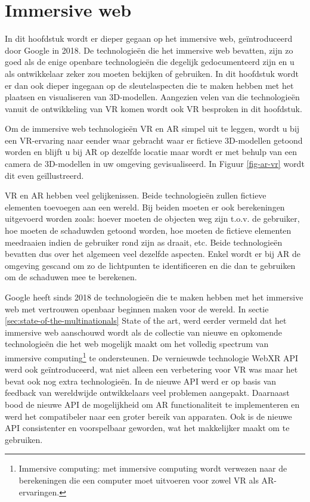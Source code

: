\chapter{Immersive web}
\label{ch:immersive-web}

In dit hoofdstuk wordt er dieper gegaan op het immersive web, geïntroduceerd door Google in 2018. De technologieën die het immersive web bevatten, zijn zo goed als de enige openbare technologieën die degelijk gedocumenteerd zijn en u als ontwikkelaar zeker zou moeten bekijken of gebruiken. In dit hoofdstuk wordt er dan ook dieper ingegaan op de sleutelaspecten die te maken hebben met het plaatsen en visualiseren van 3D-modellen.
Aangezien velen van die technologieën vanuit de ontwikkeling van VR komen wordt ook VR besproken in dit hoofdstuk.

Om de immersive web technologieën VR en AR simpel uit te leggen, wordt u bij een VR-ervaring naar eender waar gebracht waar er fictieve 3D-modellen getoond worden en blijft u bij AR op dezelfde locatie maar wordt er met behulp van een camera de 3D-modellen in uw omgeving gevisualiseerd. In Figuur \ref{fig-ar-vr} wordt dit even geïllustreerd. 

VR en AR hebben veel gelijkenissen. Beide technologieën zullen fictieve elementen toevoegen aan een wereld. Bij beiden moeten er ook berekeningen uitgevoerd worden zoals: hoever moeten de objecten weg zijn t.o.v. de gebruiker, hoe moeten de schaduwden getoond worden, hoe moeten de fictieve elementen meedraaien indien de gebruiker rond zijn as draait, etc. Beide technologieën bevatten dus over het algemeen veel dezelfde aspecten. Enkel wordt er bij AR de omgeving gescand om zo de lichtpunten te identificeren en die dan te gebruiken om de schaduwen mee te berekenen.

Google heeft sinds 2018 de technologieën die te maken hebben met het immersive web met vertrouwen openbaar beginnen maken voor de wereld. 
In sectie \ref{sec:state-of-the-multinationals} State of the art, werd eerder vermeld dat het immersive web aanschouwd wordt als de collectie van nieuwe en opkomende technologieën die het web mogelijk maakt om het volledig spectrum van immersive computing\footnote{Immersive computing: met immersive computing wordt verwezen naar de berekeningen die een computer moet uitvoeren voor zowel VR als AR-ervaringen.} te ondersteunen. De vernieuwde technologie WebXR API werd ook geïntroduceerd, wat niet alleen een verbetering voor VR was maar het bevat ook nog extra technologieën. In de nieuwe API werd er op basis van feedback van wereldwijde ontwikkelaars veel problemen aangepakt. Daarnaast bood de nieuwe API de mogelijkheid om AR functionaliteit te implementeren en werd het compatibeler naar een groter bereik van apparaten. Ook is de nieuwe API consistenter en voorspelbaar geworden, wat het makkelijker maakt om te gebruiken. 


